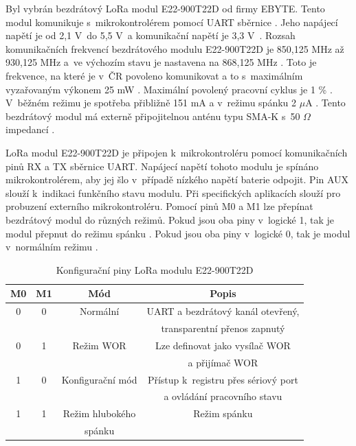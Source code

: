 Byl vybrán bezdrátový LoRa modul E22-900T22D od firmy EBYTE. Tento modul komunikuje s~mikrokontrolérem pomocí UART sběrnice \cite{LoRa_ebyte}. Jeho napájecí napětí je od 
2,1 V~do 5,5 V~a komunikační napětí je 3,3 V~\cite{LoRa_ebyte}. Rozsah komunikačních frekvencí bezdrátového modulu E22-900T22D je 850,125 MHz až 930,125 MHz a~ve výchozím 
stavu je nastavena na 868,125 MHz \cite{LoRa_ebyte}. Toto je frekvence, na které je v~ČR povoleno komunikovat a to s~maximálním vyzařovaným výkonem 25 mW \cite{CTU}. 
Maximální povolený pracovní cyklus je 1 \% \cite{CTU}. %
V~běžném režimu je spotřeba přibližně 151 mA a v~režimu spánku 2 $\mu$A \cite{LoRa_ebyte}. Tento bezdrátový modul má externě připojitelnou anténu typu SMA-K s~50 $\Omega$ 
impedancí \cite{LoRa_ebyte}.

LoRa modul E22-900T22D je připojen k~mikrokontroléru pomocí komunikačních pinů RX a TX sběrnice UART. Napájecí napětí tohoto modulu je spínáno mikrokontrolérem, aby jej 
šlo v~případě nízkého napětí baterie odpojit. Pin AUX slouží k~indikaci funkčního stavu modulu. Při specifických aplikacích slouží pro probuzení externího mikrokontroléru. 
Pomocí pinů M0 a M1 lze přepínat bezdrátový modul do různých režimů. Pokud jsou oba piny v~logické 1, 
tak je modul přepnut do režimu spánku \cite{LoRa_ebyte}. Pokud jsou oba piny v~logické 0, tak je modul v~normálním režimu \cite{LoRa_ebyte}. 

\begin{table}[!h]
  \caption[Konfigurační piny LoRa modulu E22-900T22D]{Konfigurační piny LoRa modulu E22-900T22D \cite{LoRa_ebyte}}
  \begin{center}
  	\small
	  \begin{tabular}{|c|c|c|c|}
	    \hline
	    \textbf{M0}	& \textbf{M1}	& \textbf{Mód} & \textbf{Popis} \\
	    \hline
	    0	& 0 & Normální & UART a bezdrátový kanál otevřený, \\ 
      & & &transparentní přenos zapnutý \\ 
	    \hline
	    0	& 1 & Režim WOR & Lze definovat jako vysílač WOR \\
      & & & a přijímač WOR \\ 
	    \hline
	    1 & 0 & Konfigurační mód & Přístup k~registru přes sériový port \\
      & & & a ovládání pracovního stavu \\
	    \hline
      1 & 1 & Režim hlubokého & Režim spánku \\
      & & spánku & \\
	    \hline
	  \end{tabular}
  \end{center}
\end{table}

